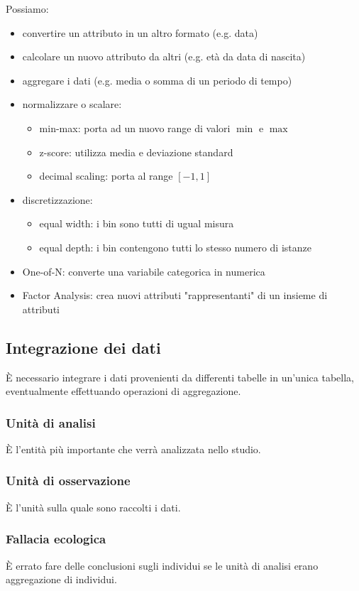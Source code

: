 \documentclass[11pt,onecolumn,a4paper,oneside]{book}
\begin{document}
Possiamo:
\begin{itemize}
\item convertire un attributo in un altro formato (e.g. data)
\item calcolare un nuovo attributo da altri (e.g. età da data di nascita)
\item aggregare i dati (e.g. media o somma di un periodo di tempo)
\item normalizzare o scalare:
\begin{itemize}
\item min-max: porta ad un nuovo range di valori $\min$ e $\max$
\item z-score: utilizza media e deviazione standard
\item decimal scaling: porta al range $[-1,1]$
\end{itemize}
\item discretizzazione:
\begin{itemize}
\item equal width: i bin sono tutti di ugual misura
\item equal depth: i bin contengono tutti lo stesso numero di istanze
\end{itemize}
\item One-of-N: converte una variabile categorica in numerica
\item Factor Analysis: crea nuovi attributi "rappresentanti" di un insieme di attributi
\end{itemize}


\subsection{Integrazione dei dati}
È necessario integrare i dati provenienti da differenti tabelle in un'unica tabella, eventualmente effettuando operazioni di aggregazione.

\subsubsection{Unità di analisi}
È l'entità più importante che verrà analizzata nello studio.

\subsubsection{Unità di osservazione}
È l'unità sulla quale sono raccolti i dati.

\subsubsection{Fallacia ecologica}
È errato fare delle conclusioni sugli individui se le unità di analisi erano aggregazione di individui.
\end{document}
